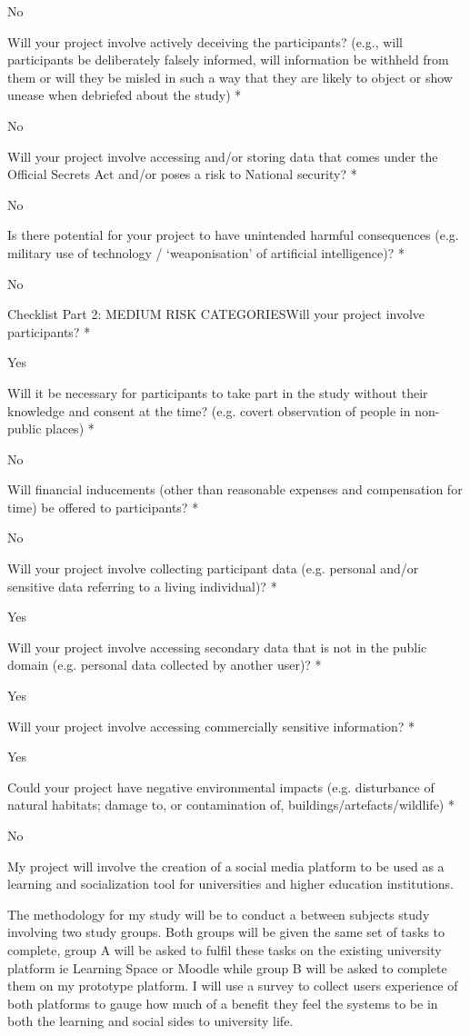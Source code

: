 \documentclass[lettersize,journal]{IEEEtran}
\begin{document}
{No

Will your project involve actively deceiving the participants? (e.g., will participants be deliberately falsely informed, will information be withheld from them or will they be misled in such a way that they are likely to object or show unease when debriefed about the study) *

No

Will your project involve accessing and/or storing data that comes under the Official Secrets Act and/or poses a risk to National security? *

No

Is there potential for your project to have unintended harmful consequences (e.g. military use of technology / ‘weaponisation’ of artificial intelligence)? *

No



Checklist Part 2: MEDIUM RISK CATEGORIESWill your project involve participants? *

Yes

Will it be necessary for participants to take part in the study without their knowledge and consent at the time? (e.g. covert observation of people in non-public places) *

No

Will financial inducements (other than reasonable expenses and compensation for time) be offered to participants? *

No

Will your project involve collecting participant data (e.g. personal and/or sensitive data referring to a living individual)? *

Yes

Will your project involve accessing secondary data that is not in the public domain (e.g. personal data collected by another user)? *

Yes

Will your project involve accessing commercially sensitive information? *

Yes

Could your project have negative environmental impacts (e.g. disturbance of natural habitats; damage to, or contamination of, buildings/artefacts/wildlife) *

No

My project will involve the creation of a social media platform to be used as a learning and socialization tool for universities and higher education institutions.

The methodology for my study will be to conduct a between subjects study involving two study groups. Both groups will be given the same set of tasks to complete, group A will be asked to fulfil these tasks on the existing university platform ie Learning Space or Moodle while group B will be asked to complete them on my prototype platform. 
I will use a survey to collect users experience of both platforms to gauge how much of a benefit they feel the systems to be in both the learning and social sides to university life.

}
\end{document}
